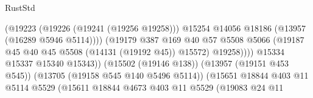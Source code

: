 \begin{lexlean}{RustStd}
\begin{coremodule}
                                                        (@19223
                                                          (@19226 (@19241 (@19256 @19258)))
                                                          @15254
                                                          @14056
                                                          @18186
                                                          (@13957 (@16289 @5946 @5114))))
                                                      (@19179
                                                        @387
                                                        @169
                                                        @40
                                                        @57
                                                        @5508
                                                        @5066
                                                        (@19187
                                                          @45
                                                          @40
                                                          @45
                                                          @5508
                                                          (@14131 (@19192 @45))
                                                          @15572)
                                                        @19258))))
                                                @15334
                                                @15337
                                                @15340
                                                @15343))
                                            (@15502 (@19146 @138))
                                            (@13957 (@19151 @453 @545))
                                            (@13705 (@19158 @545 @140 @5496 @5114))
                                            (@15651
                                              @18844
                                              @403
                                              @11
                                              @5114
                                              @5529
                                              (@15611
                                                @18844
                                                @4673
                                                @403
                                                @11
                                                @5529
                                                (@19083
                                                  @24
                                                  @11

\end{coremodule}
\end{lexlean}
